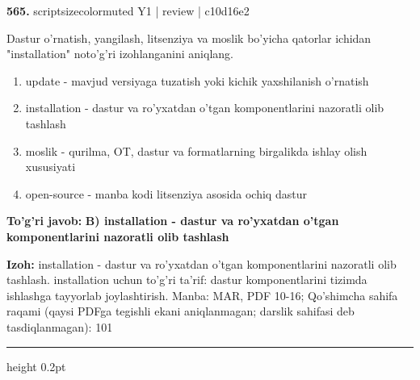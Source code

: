 \documentclass[10pt,a4paper]{article}
\begin{document}
{\bfseries\sffamily\color{ink} 565.} {scriptsizecolor{muted} Y1 | review | c10d16e2}
\par
Dastur o'rnatish, yangilash, litsenziya va moslik bo'yicha qatorlar ichidan "installation" noto'g'ri izohlanganini aniqlang.
\begin{enumerate}[label=\Alph*),leftmargin=9mm]
\item update - mavjud versiyaga tuzatish yoki kichik yaxshilanish o'rnatish
\item installation - dastur va ro'yxatdan o'tgan komponentlarini nazoratli olib tashlash
\item moslik - qurilma, OT, dastur va formatlarning birgalikda ishlay olish xususiyati
\item open-source - manba kodi litsenziya asosida ochiq dastur
\end{enumerate}
\begin{tcolorbox}[enhanced,breakable,colback=teal!4,colframe=teal!60!black,boxrule=0.45pt,arc=1.2mm,left=2.7mm,right=2.7mm,top=1.8mm,bottom=1.8mm,before skip=2mm,after skip=2mm]
{\bfseries\sffamily\color{teal}To'g'ri javob:} \textbf{B) installation - dastur va ro'yxatdan o'tgan komponentlarini nazoratli olib tashlash}
\par\smallskip
{\bfseries Izoh:} installation - dastur va ro'yxatdan o'tgan komponentlarini nazoratli olib tashlash. installation uchun to'g'ri ta'rif: dastur komponentlarini tizimda ishlashga tayyorlab joylashtirish. Manba: MAR, PDF 10-16; Qo'shimcha sahifa raqami (qaysi PDFga tegishli ekani aniqlanmagan; darslik sahifasi deb tasdiqlanmagan): 101
\end{tcolorbox}
\vspace{2mm}\hrule height 0.2pt\vspace{3mm}
\end{document}
